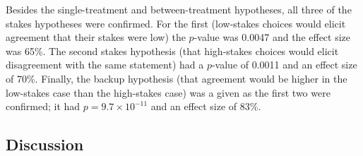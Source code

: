 Besides the single-treatment and between-treatment hypotheses, all three of the stakes hypotheses were confirmed.
%
For the first (low-stakes choices would elicit agreement that their stakes were low) the $p$-value was 0.0047 and the effect size was 65\%.
%
The second stakes hypothesis (that high-stakes choices would elicit disagreement with the same statement) had a $p$-value of 0.0011 and an effect size of 70\%.
%
Finally, the backup hypothesis (that agreement would be higher in the low-stakes case than the high-stakes case) was a given as the first two were confirmed; it had $p = 9.7\times10^{-11}$ and an effect size of 83\%.


\subsection{Discussion}

